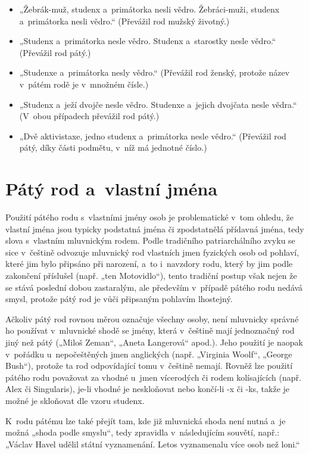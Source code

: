 \begin{itemize}
\item „Žebrák-muž, studenx a primátorka nesli vědro. Žebráci-muži, studenx a primátorka nesli vědro.“ (Převážil rod mužský životný.)
\item „Studenx a primátorka nesle vědro. Studenx a starostky nesle vědro.“ (Převážil rod pátý.)
\item „Studenxe a primátorka nesly vědro.“ (Převážil rod ženský, protože název v pátém rodě je v množném čísle.)
\item „Studenx a ježí dvojče nesle vědro. Studenxe a jejich dvojčata nesle vědra.“ (V obou případech převážil rod pátý.)
\item „Dvě aktivistaxe, jedno studenx a primátorka nesle vědro.“ (Převážil rod pátý, díky části podmětu, v níž má jednotné číslo.)
\end{itemize}

\section{Pátý rod a vlastní jména}

Použití pátého rodu s vlastními jmény osob je problematické v tom ohledu,
že vlastní jména jsou typicky podstatná jména či zpodstatnělá přídavná jména,
tedy slova s vlastním mluvnickým rodem. Podle tradičního patriarchálního zvyku
se sice v češtině odvozuje mluvnický rod vlastních jmen fyzických osob od pohlaví,
které jim bylo připsáno při narození, a to i navzdory rodu, který by jim
podle zakončení příslušel (např. „ten Motovidlo“), tento tradiční postup však
nejen že se stává poslední dobou zastaralým, ale především v případě pátého rodu
nedává smysl, protože pátý rod je vůči připsaným pohlavím lhostejný.

Ačkoliv pátý rod rovnou měrou označuje všechny osoby, není mluvnicky správné
ho používat v mluvnické shodě se jmény, která v češtině mají jednoznačný rod
jiný než pátý („Miloš Zeman“, „Aneta Langerová“ apod.).
Jeho použití je naopak v pořádku u nepočeštěných jmen anglických
(např. „Virginia Woolf“, „George Bush“), protože ta rod odpovídající
tomu v češtině nemají. Rovněž lze použití pátého rodu považovat za vhodné
u jmen vícerodých či rodem kolísajících (např. Alex či Singularis),
je-li vhodné je neskloňovat nebo končí-li -x či -ks, takže je možné je skloňovat
dle vzoru studenx.

K rodu pátému lze také přejít tam, kde již mluvnická shoda není nutná
a je možná „shoda podle smyslu“, tedy zpravidla v následujícím souvětí, např.:
„Václav Havel udělil státní vyznamenání. Letos vyznamenalu více osob než loni.“

